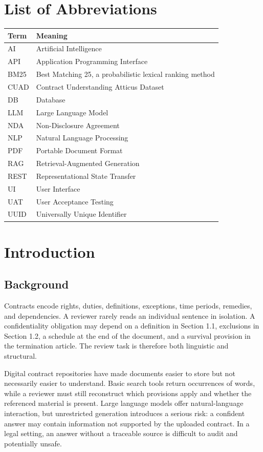 \documentclass[12pt,a4paper,oneside]{report}
\begin{document}
\chapter*{List of Abbreviations}
\begin{longtable}{p{}p{}}
\toprule
\textbf{Term} & \textbf{Meaning}\\
\midrule
AI & Artificial Intelligence\\
API & Application Programming Interface\\
BM25 & Best Matching 25, a probabilistic lexical ranking method\\
CUAD & Contract Understanding Atticus Dataset\\
DB & Database\\
LLM & Large Language Model\\
NDA & Non-Disclosure Agreement\\
NLP & Natural Language Processing\\
PDF & Portable Document Format\\
RAG & Retrieval-Augmented Generation\\
REST & Representational State Transfer\\
UI & User Interface\\
UAT & User Acceptance Testing\\
UUID & Universally Unique Identifier\\
\bottomrule
\end{longtable}

\clearpage
{}

\chapter{Introduction}

\section{Background}
Contracts encode rights, duties, definitions, exceptions, time periods, remedies, and dependencies. A reviewer rarely reads an individual sentence in isolation. A confidentiality obligation may depend on a definition in Section 1.1, exclusions in Section 1.2, a schedule at the end of the document, and a survival provision in the termination article. The review task is therefore both linguistic and structural.

Digital contract repositories have made documents easier to store but not necessarily easier to understand. Basic search tools return occurrences of words, while a reviewer must still reconstruct which provisions apply and whether the referenced material is present. Large language models offer natural-language interaction, but unrestricted generation introduces a serious risk: a confident answer may contain information not supported by the uploaded contract. In a legal setting, an answer without a traceable source is difficult to audit and potentially unsafe.
\end{document}
